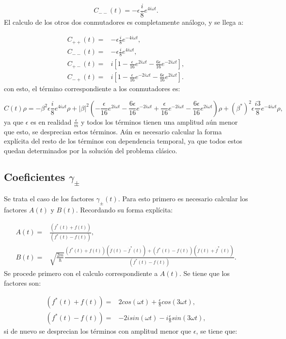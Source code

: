 \documentclass[a4paper,10pt]{report}
\begin{document}
\begin{equation*}
C_{--}(t) = -\epsilon\frac{i}{8}e^{4i\omega t}.
\end{equation*} El calculo de los otros dos conmutadores es completamente análogo, y se llega a:

\begin{align}
C_{++}(t) =& -\epsilon\frac{i}{8}e^{-4i\omega t},\\
C_{--}(t) =& -\epsilon\frac{i}{8}e^{4i\omega t},\\
C_{+-}(t) =& i [1 -\frac{\epsilon}{16}e^{2i\omega t}-\frac{6\epsilon}{16}e^{-2i\omega t}],\\
C_{-+}(t) =& i [1 -\frac{\epsilon}{16}e^{-2i\omega t}-\frac{6\epsilon}{16}e^{2i\omega t}].
\end{align} con esto, el término correspondiente a los conmutadores es:

\begin{equation}
C(t)\rho=-\beta^2\epsilon\frac{i}{8}e^{4i\omega t}\rho + |\beta|^2(-\frac{\epsilon}{16}e^{2i\omega t}-\frac{6\epsilon}{16}e^{-2i\omega t} + \frac{\epsilon}{16}e^{-2i\omega t}-\frac{6\epsilon}{16}e^{2i\omega t})\rho +(\beta^*)^2\epsilon\frac{i3}{8}e^{-4i\omega t}\rho,
\end{equation} ya que $\epsilon$ es en realidad $\frac{\epsilon}{m}$ y todos los términos tienen una amplitud aún menor que esto, se desprecian estos términos. Aún es necesario calcular la forma explícita del resto de los términos con dependencia temporal, ya que todos estos quedan determinados por la solución del problema clásico.

\subsection{Coeficientes $\gamma_\pm$}

Se trata el caso de los factores $\gamma_{\pm}(t)$. Para esto primero es necesario calcular los factores $A(t)$ y $B(t)$. Recordando su forma explícita:

\begin{align}
A(t) =& \frac{(f^* (t) + f(t))}{(f^* (t) - f(t))}, \\
B(t) =& \sqrt{\frac{2m}{\hbar}}\frac{(f^* (t) + f(t))(\dot{f}(t) - \dot{f}^*(t))+(f^* (t) - f(t))(\dot{f}(t) + \dot{f}^* (t))}{(f^* (t) - f(t))}.
\end{align} Se procede primero con el calculo correspondiente a $A(t)$. Se tiene que los factores son:

\begin{align*}
(f^* (t) + f(t)) =& 2cos(\omega t) +\frac{\epsilon}{8}cos(3\omega t), \\
(f^* (t) - f(t)) =& -2isin(\omega t) -i\frac{\epsilon}{8}sin(3\omega t),
\end{align*} si de nuevo se desprecian los términos con amplitud menor que $\epsilon$, se tiene que:
\end{document}
